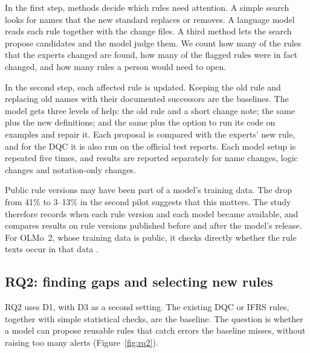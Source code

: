 \documentclass[11pt,a4paper]{article}
\let\oldsubsection\subsection
\renewcommand{\subsection}{\FloatBarrier\oldsubsection}
\begin{document}
In the first step, methods decide which rules need attention. A simple search looks for names that the new standard replaces or removes. A language model reads each rule together with the change files. A third method lets the search propose candidates and the model judge them. We count how many of the rules that the experts changed are found, how many of the flagged rules were in fact changed, and how many rules a person would need to open.

In the second step, each affected rule is updated. Keeping the old rule and replacing old names with their documented successors are the baselines. The model gets three levels of help: the old rule and a short change note; the same plus the new definitions; and the same plus the option to run its code on examples and repair it. Each proposal is compared with the experts' new rule, and for the DQC it is also run on the official test reports. Each model setup is repeated five times, and results are reported separately for name changes, logic changes and notation-only changes.

Public rule versions may have been part of a model's training data. The drop from 41\% to 3--13\% in the second pilot suggests that this matters. The study therefore records when each rule version and each model became available, and compares results on rule versions published before and after the model's release. For OLMo~2, whose training data is public, it checks directly whether the rule texts occur in that data \cite{olmo2,olmotrace}.

\subsection{RQ2: finding gaps and selecting new rules}
\label{sec:rq2}

RQ2 uses D1, with D3 as a second setting. The existing DQC or IFRS rules, together with simple statistical checks, are the baseline. The question is whether a model can propose reusable rules that catch errors the baseline misses, without raising too many alerts (Figure~\ref{fig:rq2}).
\end{document}
